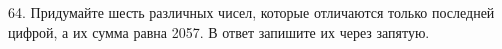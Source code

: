 64. Придумайте шесть различных чисел, которые отличаются только последней цифрой, а их сумма равна 2057. В ответ запишите их через запятую.\\
